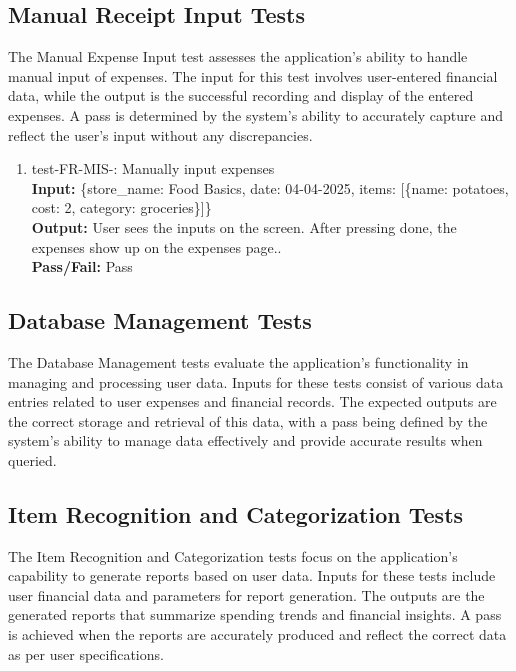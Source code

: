 \documentclass[12pt, titlepage]{article}
\begin{document}
\subsection{Manual Receipt Input Tests}
The Manual Expense Input test assesses the application’s ability to handle manual 
input of expenses. The input for this test involves user-entered financial data, while the 
output is the successful recording and display of the entered expenses. A pass is determined 
by the system's ability to accurately capture and reflect the user's input without any 
discrepancies.

\begin{enumerate}
  \item test-FR-MIS-: Manually input expenses\\
    \textbf{Input:} \{store\_name: Food Basics, date: 04-04-2025, items: [\{name:
    potatoes, cost: 2, category: groceries\}]\}\\
    \textbf{Output:} User sees the inputs on the screen. After pressing done,
    the expenses show up on the expenses page..\\
    \textbf{Pass/Fail:} Pass\\
\end{enumerate}

\subsection{Database Management Tests}
The Database Management tests evaluate the application's functionality in managing and processing
user data. Inputs for these tests consist of various data entries related to user expenses 
and financial records. The expected outputs are the correct storage and retrieval of this 
data, with a pass being defined by the system's ability to manage data effectively and 
provide accurate results when queried.

\subsection{Item Recognition and Categorization Tests}
The Item Recognition and Categorization tests focus on the application's capability to generate reports based 
on user data. Inputs for these tests include user financial data and parameters for report 
generation. The outputs are the generated reports that summarize spending trends and 
financial insights. A pass is achieved when the reports are accurately produced and reflect 
the correct data as per user specifications.
\end{document}
